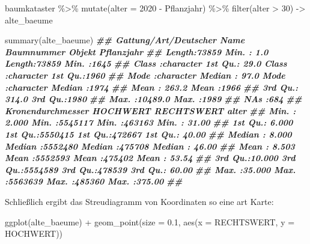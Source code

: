 \documentclass[11pt,german,a4paper]{article}
\newenvironment{Shaded}{\begin{snugshade}}{\end{snugshade}}
\newcommand{\AttributeTok}[1]{\textcolor[rgb]{0.77,0.63,0.00}{#1}}
\newcommand{\DecValTok}[1]{\textcolor[rgb]{0.00,0.00,0.81}{#1}}
\newcommand{\DocumentationTok}[1]{\textcolor[rgb]{0.56,0.35,0.01}{\textbf{\textit{#1}}}}
\newcommand{\FloatTok}[1]{\textcolor[rgb]{0.00,0.00,0.81}{#1}}
\newcommand{\FunctionTok}[1]{\textcolor[rgb]{0.00,0.00,0.00}{#1}}
\newcommand{\NormalTok}[1]{#1}
\newcommand{\OtherTok}[1]{\textcolor[rgb]{0.56,0.35,0.01}{#1}}
\newcommand{\SpecialCharTok}[1]{\textcolor[rgb]{0.00,0.00,0.00}{#1}}
\begin{document}
\begin{Shaded}
\begin{Highlighting}[]
\NormalTok{baumkataster }\SpecialCharTok{\%\textgreater{}\%}
  \FunctionTok{mutate}\NormalTok{(}\AttributeTok{alter =} \DecValTok{2020} \SpecialCharTok{{-}}\NormalTok{ Pflanzjahr) }\SpecialCharTok{\%\textgreater{}\%}
  \FunctionTok{filter}\NormalTok{(alter }\SpecialCharTok{\textgreater{}} \DecValTok{30}\NormalTok{) }\OtherTok{{-}\textgreater{}}
\NormalTok{  alte\_baeume}

\FunctionTok{summary}\NormalTok{(alte\_baeume)}
\DocumentationTok{\#\#  Gattung/Art/Deutscher Name   Baumnummer         Objekt            Pflanzjahr  }
\DocumentationTok{\#\#  Length:73859               Min.   :    1.0   Length:73859       Min.   :1645  }
\DocumentationTok{\#\#  Class :character           1st Qu.:   29.0   Class :character   1st Qu.:1960  }
\DocumentationTok{\#\#  Mode  :character           Median :   97.0   Mode  :character   Median :1974  }
\DocumentationTok{\#\#                             Mean   :  263.2                      Mean   :1966  }
\DocumentationTok{\#\#                             3rd Qu.:  314.0                      3rd Qu.:1980  }
\DocumentationTok{\#\#                             Max.   :10489.0                      Max.   :1989  }
\DocumentationTok{\#\#                             NA\textquotesingle{}s   :684                                        }
\DocumentationTok{\#\#  Kronendurchmesser    HOCHWERT         RECHTSWERT         alter       }
\DocumentationTok{\#\#  Min.   : 2.000    Min.   :5545117   Min.   :463163   Min.   : 31.00  }
\DocumentationTok{\#\#  1st Qu.: 6.000    1st Qu.:5550415   1st Qu.:472667   1st Qu.: 40.00  }
\DocumentationTok{\#\#  Median : 8.000    Median :5552480   Median :475708   Median : 46.00  }
\DocumentationTok{\#\#  Mean   : 8.503    Mean   :5552593   Mean   :475402   Mean   : 53.54  }
\DocumentationTok{\#\#  3rd Qu.:10.000    3rd Qu.:5554589   3rd Qu.:478539   3rd Qu.: 60.00  }
\DocumentationTok{\#\#  Max.   :35.000    Max.   :5563639   Max.   :485360   Max.   :375.00  }
\DocumentationTok{\#\# }
\end{Highlighting}
\end{Shaded}

Schließlich ergibt das Streudiagramm von Koordinaten so eine art Karte:

\begin{Shaded}
\begin{Highlighting}[]
\FunctionTok{ggplot}\NormalTok{(alte\_baeume) }\SpecialCharTok{+}
    \FunctionTok{geom\_point}\NormalTok{(}\AttributeTok{size =} \FloatTok{0.1}\NormalTok{, }\FunctionTok{aes}\NormalTok{(}\AttributeTok{x =}\NormalTok{ RECHTSWERT, }\AttributeTok{y =}\NormalTok{ HOCHWERT))}
\end{Highlighting}
\end{Shaded}
\end{document}

